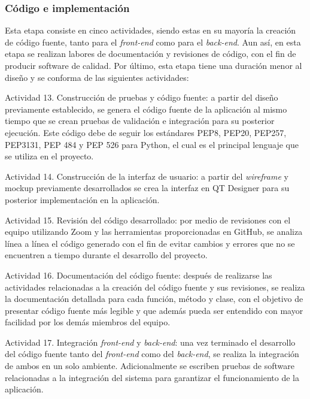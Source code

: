 \subsubsection{Código e implementación}
Esta etapa consiste en cinco actividades, siendo estas en su mayoría la creación de código fuente, tanto para el \textit{front-end} como para el \textit{back-end}. Aun así, en esta etapa se realizan labores de documentación y revisiones de código, con el fin de producir software de calidad. Por último, esta etapa tiene una duración menor al diseño y se conforma de las siguientes actividades:

\begin{APAitemize}
    \item Actividad 13. Construcción de pruebas y código fuente: a partir del diseño previamente establecido, se genera el código fuente de la aplicación al mismo tiempo que se crean pruebas de validación e integración para su posterior ejecución. Este código debe de seguir los estándares PEP8, PEP20, PEP257, PEP3131, PEP 484 y PEP 526 para Python, el cual es el principal lenguaje que se utiliza en el proyecto.
    \item Actividad 14. Construcción de la interfaz de usuario: a partir del \textit{wireframe} y mockup previamente desarrollados se crea la interfaz en QT Designer para su posterior implementación en la aplicación.
    \item Actividad 15. Revisión del código desarrollado: por medio de revisiones con el equipo utilizando Zoom y las herramientas proporcionadas en GitHub, se analiza línea a línea el código generado con el fin de evitar cambios y errores que no se encuentren a tiempo durante el desarrollo del proyecto.
    \item Actividad 16. Documentación del código fuente: después de realizarse las actividades relacionadas a la creación del código fuente y sus revisiones, se realiza la documentación detallada para cada función, método y clase, con el objetivo de presentar código fuente más legible y que además pueda ser entendido con mayor facilidad por los demás miembros del equipo.
    \item Actividad 17. Integración \textit{front-end} y \textit{back-end}: una vez terminado el desarrollo del código fuente tanto del \textit{front-end} como del \textit{back-end}, se realiza la integración de ambos en un solo ambiente. Adicionalmente se escriben pruebas de software relacionadas a la integración del sistema para garantizar el funcionamiento de la aplicación.
\end{APAitemize}

